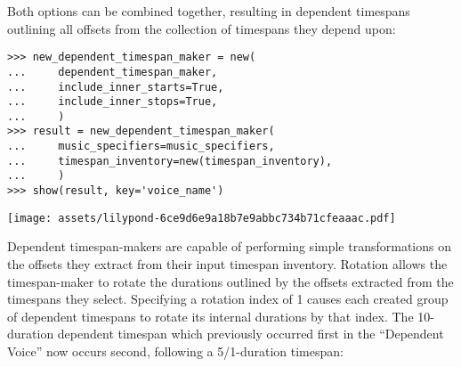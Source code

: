 \noindent Both options can be combined together, resulting in dependent
timespans outlining all offsets from the collection of timespans they depend
upon:

\begin{comment}
<abjad>
new_dependent_timespan_maker = new(
    dependent_timespan_maker,
    include_inner_starts=True,
    include_inner_stops=True,
    )
result = new_dependent_timespan_maker(
    music_specifiers=music_specifiers,
    timespan_inventory=new(timespan_inventory),
    )
show(result, key='voice_name')
</abjad>
\end{comment}

\begin{abjadbookoutput}
\begin{singlespacing}
\vspace{-0.5\baselineskip}
\begin{verbatim}
>>> new_dependent_timespan_maker = new(
...     dependent_timespan_maker,
...     include_inner_starts=True,
...     include_inner_stops=True,
...     )
>>> result = new_dependent_timespan_maker(
...     music_specifiers=music_specifiers,
...     timespan_inventory=new(timespan_inventory),
...     )
>>> show(result, key='voice_name')
\end{verbatim}
\noindent\texttt{[image: assets/lilypond-6ce9d6e9a18b7e9abbc734b71cfeaaac.pdf]}
\end{singlespacing}
\end{abjadbookoutput}

\noindent Dependent timespan-makers are capable of performing simple
transformations on the offsets they extract from their input timespan
inventory. Rotation allows the timespan-maker to rotate the durations outlined
by the offsets extracted from the timespans they select. Specifying a rotation
index of 1 causes each created group of dependent timespans to rotate its
internal durations by that index. The 10-duration dependent timespan which
previously occurred first in the \enquote{Dependent Voice} now occurs second,
following a 5/1-duration timespan:

\begin{comment}
<abjad>
rotated_dependent_timespan_maker = new(
    new_dependent_timespan_maker,
    rotation_indices=(1,),
    )
result = rotated_dependent_timespan_maker(
    music_specifiers=music_specifiers,
    timespan_inventory=new(timespan_inventory),
    )
show(result, key='voice_name', range_=(0, 75))
</abjad>
\end{comment}

